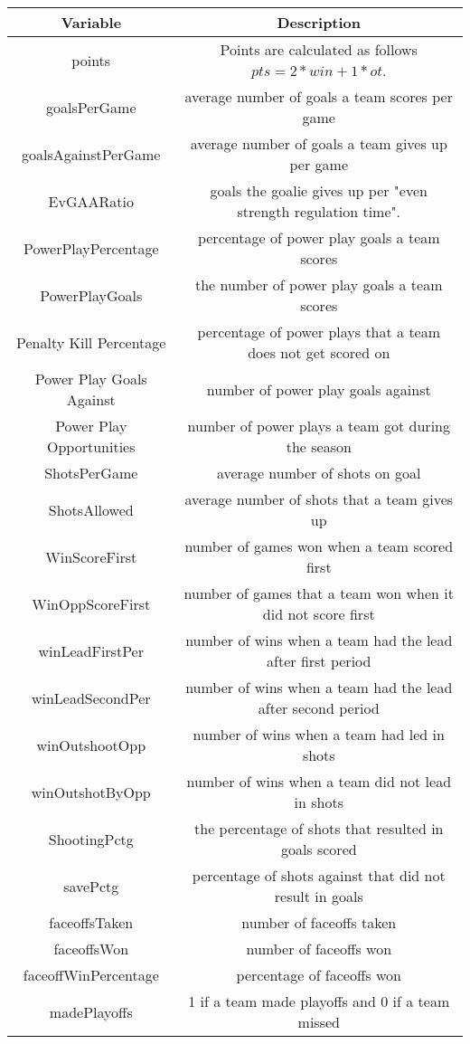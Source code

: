 \begin{flushleft}
\begin{tabular}{|c|c|}
	\hline
	Variable & Description \\
	\hline
	points &  Points are calculated as follows $pts = 2*win + 1*ot$.  \\
	\hline
	goalsPerGame & average number of goals a team scores per game \\
	\hline
	goalsAgainstPerGame & average number of goals a team gives up per game \\
	\hline
	EvGAARatio & goals the goalie gives up per "even strength regulation time".\cite{GAA} \\
	\hline
	PowerPlayPercentage &  percentage of power play goals a team scores \\
	\hline
	PowerPlayGoals & the number of power play goals a team scores \\
	\hline
	Penalty Kill Percentage & percentage of power plays that a team does not get scored on \\
	\hline
	Power Play Goals Against & number of power play goals against \\
	\hline
	Power Play Opportunities & number of power plays a team got during the season \\
	\hline
	ShotsPerGame & average number of shots on goal  \\
	\hline
	ShotsAllowed & average number of shots that a team gives up  \\
	\hline
	WinScoreFirst & number of games won when a team scored first \\
	\hline
	WinOppScoreFirst & number of games that a team won when it did not score first  \\
	\hline
	winLeadFirstPer & number of wins when a team had the lead after first period \\
	\hline
	winLeadSecondPer & number of wins when a team had the lead after second period \\
	\hline
	winOutshootOpp & number of wins when a team had led in shots \\
	\hline
	winOutshotByOpp & number of wins when a team did not lead in shots \\
	\hline
	ShootingPctg & the percentage of shots that resulted in goals scored \\
	\hline
	savePctg & percentage of shots against that did not result in goals \\
	\hline
	faceoffsTaken & number of faceoffs taken\\
	\hline
	faceoffsWon & number of faceoffs won\\
	\hline
	faceoffWinPercentage & percentage of faceoffs won \\
	\hline
	madePlayoffs & 1 if a team made playoffs and 0 if a team missed \\
	\hline
	\end{tabular}
\label{tbl:Table of Variables}
\end{flushleft}
